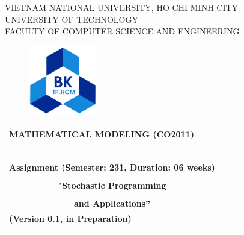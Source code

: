 \documentclass[a4paper]{article}
\begin{document}
\begin{titlepage}
\begin{center}
VIETNAM NATIONAL UNIVERSITY, HO CHI MINH CITY \\
UNIVERSITY OF TECHNOLOGY \\
FACULTY OF COMPUTER SCIENCE AND ENGINEERING
\end{center}

\vspace{1cm}

\begin{figure}[h!]
\begin{center}
\includegraphics[width=3cm]{graphics/hcmut.png}
\end{center}
\end{figure}

\vspace{1cm}


\begin{center}
\begin{tabular}{c}
\multicolumn{1}{l}{\textbf{{\Large MATHEMATICAL MODELING (CO2011)}}}\\
~~\\
\hline
\\
\multicolumn{1}{l}{\textbf{{Assignment (Semester: 231, Duration: 06 weeks)}}}\\
\\
\textbf{{\Huge "Stochastic Programming}}\\
\\
\textbf{{\Huge and Applications”}}\\[10pt]

\multicolumn{1}{l}{\textbf{{(Version 0.1, in Preparation)}}}\\
\\
\hline
\end{tabular}
\end{center}

\vspace{2cm}


\end{titlepage}
\end{document}
